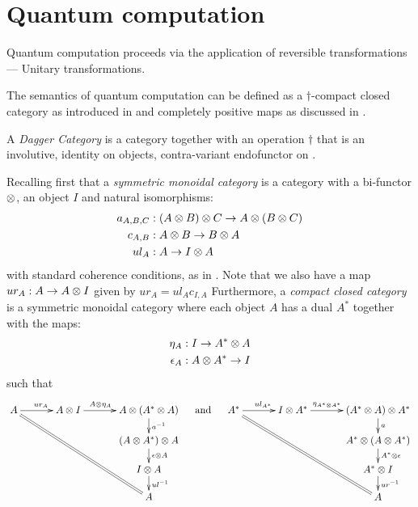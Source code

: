 \section{Quantum computation} %
\label{sec:quantum_computation}

Quantum computation proceeds via the application of reversible transformations --- Unitary
transformations.

The semantics of quantum computation can be defined as a $\dagger$-compact closed category as
introduced in \cite{abramsky02:traces,abramsky05:abstracttraces} and completely positive maps as
discussed in \cite{selinger05:dagger}.

\begin{definition}
  A \emph{Dagger Category}\cite{selinger05:dagger} is a category \C together with an operation
  $\dagger$ that is an involutive, identity on objects, contra-variant endofunctor on \C.
\end{definition}
Recalling first that a \emph{symmetric monoidal category} is a category \B with a bi-functor $\otimes$,
an object $I$ and natural isomorphisms:
\begin{align*}
  a_{A,B,C}&: (A\otimes B)\otimes C \to A\otimes (B\otimes C)\\
  c_{A,B} &:A\otimes B \to B\otimes A\\
  ul_A &:A \to I \otimes A
\end{align*}
with standard coherence conditions, as in \cite{maclan97:categorieswrkmath}. Note that we
also have a map $ur_A: A \to A\otimes I$ given by $ur_A = ul_A c_{I,A}$ Furthermore, a \emph{compact
closed category} \C is a symmetric monoidal category where each object $A$ has a dual $A^{*}$
together with the maps:
\begin{align*}
  \eta_A:I \to {A}^{*} \otimes A\\
  \epsilon_A : A\otimes{A}^{*} \to I
\end{align*}
such that
\[
  \xymatrix@C+8pt@R-10pt{
    A \ar[r]^{ur_A} \ar@{=}[dddrr]
      & A\* I \ar[r]^(.4){A\*\eta_A}
      & A\* (\dual{A}\*A) \ar[d]^{a^{-1}}\\
    & & (A\*\dual{A})\*A \ar[d]^{\epsilon\*A}\\
    & & I\* A \ar[d]^{ul^{-1}}\\
    & & A
  }
  \quad\text{ and  }\quad
  \xymatrix@C+8pt@R-10pt{
    \dual{A} \ar[r]^{ul_{\dual{A}}} \ar@{=}[dddrr]
      & I\*\dual{A} \ar[r]^(.4){\eta_{\dual{A}\*\dual{A}}}
      & (\dual{A}\*A)\*\dual{A} \ar[d]^{a}\\
    & & \dual{A}\*(A\*\dual{A}) \ar[d]^{\dual{A}\*\epsilon}\\
    & & \dual{A}\*I \ar[d]^{ur^{-1}}\\
    & & A
  }
\]

